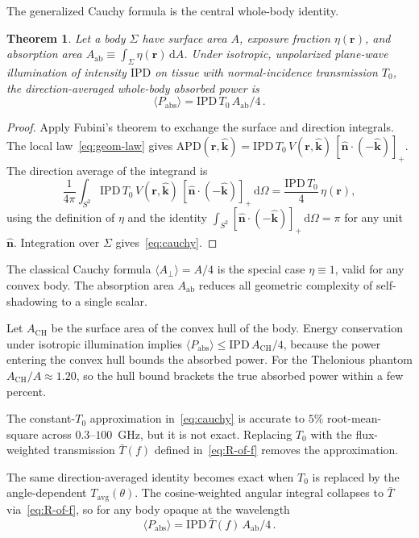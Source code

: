 \documentclass[journal,twocolumn,10pt]{IEEEtran}
\theoremstyle{plain}
\newtheorem{theorem}{Theorem}
\newcommand{\khat}{\hat{\bm{k}}}
\newcommand{\nhat}{\hat{\bm{n}}}
\newcommand{\rr}{\mathbf{r}}
\newcommand{\IPD}{\mathrm{IPD}}
\newcommand{\APD}{\mathrm{APD}}
\newcommand{\Aab}{A_{\mathrm{ab}}}
\newcommand{\Aperp}{A_\perp}
\newcommand{\Tavg}{T_{\mathrm{avg}}}
\newcommand{\Tbar}{\bar{T}}
\newcommand{\diff}{\mathrm{d}}
\newcommand{\pospart}[1]{\left[#1\right]_{+}}
\newcommand{\Vis}{V}
\begin{document}
The generalized Cauchy formula is the central whole-body identity.
\begin{theorem}\label{thm:cauchy}
Let a body $\Sigma$ have surface area $A$, exposure fraction
$\eta(\rr)$, and absorption area
$\Aab \equiv \int_\Sigma \eta(\rr)\,\diff A$. Under isotropic,
unpolarized plane-wave illumination of intensity $\IPD$ on tissue
with normal-incidence transmission $T_0$, the direction-averaged
whole-body absorbed power is
\begin{equation}\label{eq:cauchy}
  \langle P_{\mathrm{abs}} \rangle = \IPD\,T_0\,\Aab/4\, .
\end{equation}
\end{theorem}

\begin{proof}
Apply Fubini's theorem to exchange the surface and direction
integrals. The local law~\eqref{eq:geom-law} gives
$\APD(\rr,\khat) = \IPD\,T_0\,\Vis(\rr,\khat)\,
\pospart{\nhat\cdot(-\khat)}$. The direction average of the integrand
is
\[
  \frac{1}{4\pi}\int_{S^2}
  \IPD\,T_0\,\Vis(\rr,\khat)\,\pospart{\nhat\cdot(-\khat)}\,
  \diff\Omega
  = \frac{\IPD\,T_0}{4}\,\eta(\rr),
\]
using the definition of $\eta$ and the identity $\int_{S^2}
\pospart{\nhat\cdot(-\khat)}\,\diff\Omega = \pi$ for any unit
$\nhat$. Integration over $\Sigma$ gives~\eqref{eq:cauchy}.
\end{proof}

The classical Cauchy formula $\langle\Aperp\rangle = A/4$ is the
special case $\eta \equiv 1$, valid for any convex body. The
absorption area $\Aab$ reduces all geometric complexity of
self-shadowing to a single scalar.

Let $A_{\mathrm{CH}}$ be the surface area of the convex hull of the
body. Energy conservation under isotropic illumination implies
$\langle P_{\mathrm{abs}} \rangle \le \IPD\,A_{\mathrm{CH}}/4$,
because the power entering the convex hull bounds the absorbed power.
For the Thelonious phantom $A_{\mathrm{CH}}/A \approx 1.20$, so the
hull bound brackets the true absorbed power within a few percent.

The constant-$T_0$ approximation in~\eqref{eq:cauchy} is accurate to
$5\%$ root-mean-square across $0.3$--$100$~GHz, but it is not
exact. Replacing $T_0$ with the flux-weighted transmission $\Tbar(f)$
defined in~\eqref{eq:R-of-f} removes the approximation.

The same direction-averaged identity becomes exact when $T_0$ is
replaced by the angle-dependent
$\Tavg(\theta)$. The cosine-weighted angular integral collapses to
$\Tbar$ via~\eqref{eq:R-of-f}, so for any body opaque at the
wavelength
\begin{equation}\label{eq:cauchy-exact}
  \langle P_{\mathrm{abs}} \rangle = \IPD\,\Tbar(f)\,\Aab/4 \,.
\end{equation}
\end{document}
